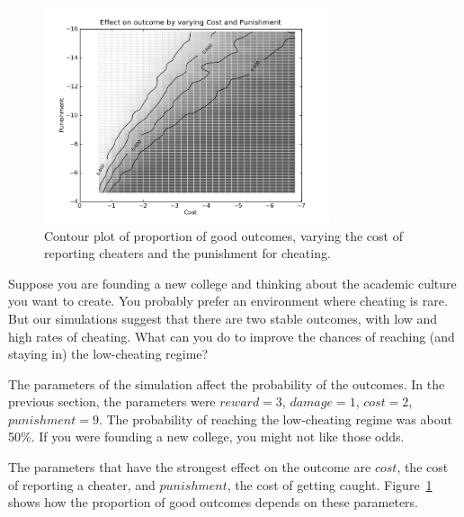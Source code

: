 \documentclass[10pt]{book}
\begin{document}
\begin{figure}
  \begin{center}
    \includegraphics[width=0.75\textwidth]{figs/varyCP_09.png}
  \end{center}
  \caption{Contour plot of proportion of good outcomes, varying the cost of reporting cheaters and the punishment for cheating.}\label{fig.varyCP}
\end{figure}

Suppose you are founding a new college and thinking about the academic
culture you want to create.  You probably prefer an
environment where cheating is rare.  But our simulations suggest that
there are two stable outcomes, with low and high rates of cheating.
What can you do to improve the chances of reaching (and staying in)
the low-cheating regime?

The parameters of the simulation affect the probability of the
outcomes.  In the previous section, the parameters were $reward = 3$,
$damage = 1$, $cost = 2$, $punishment = 9$.  The probability of
reaching the low-cheating regime was about 50\%.  If you were
founding a new college, you might not like those odds.

The parameters that have the strongest effect on the outcome are
$cost$, the cost of reporting a cheater, and $punishment$, the cost
of getting caught.  Figure~\ref{fig.varyCP}
shows how the proportion of good outcomes depends on these parameters.

\end{document}
